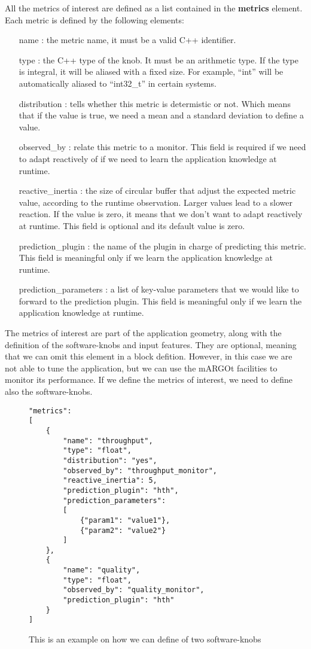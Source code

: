 All the metrics of interest are defined as a list contained in the \textbf{metrics} element.
Each metric is defined by the following elements:
\begin{itemize}
	\item[name]: the metric name, it must be a valid C++ identifier.
	\item[type]: the C++ type of the knob. It must be an arithmetic type. If the type is integral, it will be aliased with a fixed size. For example, ``int'' will be automatically aliased to ``int32\_t'' in certain systems.
	\item[distribution]: tells whether this metric is determistic or not. Which means that if the value is true, we need a mean and a standard deviation to define a value.
	\item[observed\_by]: relate this metric to a monitor. This field is required if we need to adapt reactively of if we need to learn the application knowledge at runtime.
	\item[reactive\_inertia]: the size of circular buffer that adjust the expected metric value, according to the runtime observation. Larger values lead to a slower reaction. If the value is zero, it means that we don't want to adapt reactively at runtime. This field is optional and its default value is zero.
	\item[prediction\_plugin]: the name of the plugin in charge of predicting this metric. This field is meaningful only if we learn the application knowledge at runtime.
	\item[prediction\_parameters]: a list of key-value parameters that we would like to forward to the prediction plugin. This field is meaningful only if we learn the application knowledge at runtime.
\end{itemize}

The metrics of interest are part of the application geometry, along with the definition of the software-knobs and input features.
They are optional, meaning that we can omit this element in a block defition.
However, in this case we are not able to tune the application, but we can use the mARGOt facilities to monitor its performance.
If we define the metrics of interest, we need to define also the software-knobs.

\begin{figure}
\lstset{language=json}
\begin{lstlisting}
"metrics":
[
	{
		"name": "throughput",
		"type": "float",
		"distribution": "yes",
		"observed_by": "throughput_monitor",
		"reactive_inertia": 5,
		"prediction_plugin": "hth",
		"prediction_parameters":
		[
			{"param1": "value1"},
			{"param2": "value2"}
		]
	},
	{
		"name": "quality",
		"type": "float",
		"observed_by": "quality_monitor",
		"prediction_plugin": "hth"
	}
]
\end{lstlisting}
\caption{This is an example on how we can define of two software-knobs}
\label{code:metrics}
\end{figure}



